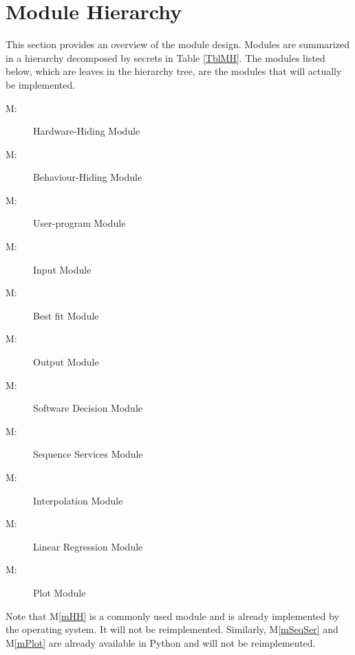 \documentclass[12pt, titlepage]{article}
\newcounter{mnum}
\newcommand{\mthemnum}{M\themnum}
\newcommand{\mref}[1]{M\ref{#1}}
\begin{document}
\section{Module Hierarchy} \label{SecMH}

This section provides an overview of the module design. Modules are summarized
in a hierarchy decomposed by secrets in Table \ref{TblMH}. The modules listed
below, which are leaves in the hierarchy tree, are the modules that will
actually be implemented.

\begin{description}
\item [ \mthemnum \label{mHH}:] Hardware-Hiding Module
\item [ \mthemnum \label{mBH}:] Behaviour-Hiding Module
\item [ \mthemnum \label{mControl}:] User-program Module
\item [ \mthemnum \label{mInput}:] Input Module

\item [ \mthemnum \label{mBestFit}:] Best fit Module
\item [ \mthemnum \label{mOutput}:] Output Module
\item [ \mthemnum \label{mSD}:] Software Decision Module
\item [ \mthemnum \label{mSeqSer}:] Sequence Services Module 
\item [ \mthemnum \label{mInterp}:] Interpolation Module
\item [ \mthemnum \label{mLinearReg}:] Linear Regression Module
\item [ \mthemnum \label{mPlot}:] Plot Module
\end{description}



Note that \mref{mHH} is a commonly used module and is already implemented by the operating system.  It will not be reimplemented.  Similarly, \mref{mSeqSer} and \mref{mPlot} are already available in Python and will not be reimplemented.
\end{document}
